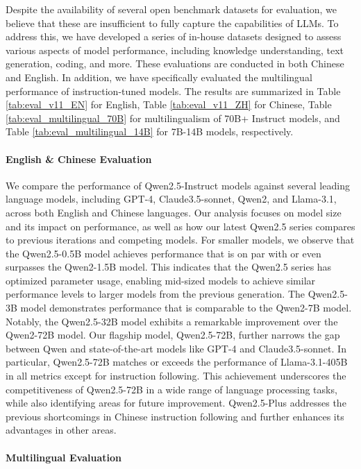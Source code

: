 Despite the availability of several open benchmark datasets for evaluation, we believe that these are insufficient to fully capture the capabilities of LLMs.
To address this, we have developed a series of in-house datasets designed to assess various aspects of model performance, including knowledge understanding, text generation, coding, and more. 
These evaluations are conducted in both Chinese and English.
In addition, we have specifically evaluated the multilingual performance of instruction-tuned models. 
The results are summarized in Table \ref{tab:eval_v11_EN} for English, Table \ref{tab:eval_v11_ZH} for Chinese, Table \ref{tab:eval_multilingual_70B} for multilingualism of 70B+ Instruct models, and Table \ref{tab:eval_multilingual_14B} for 7B-14B models, respectively.



\paragraph{English \& Chinese Evaluation}

We compare the performance of Qwen2.5-Instruct models against several leading language models, including GPT-4, Claude3.5-sonnet, Qwen2, and Llama-3.1, across both English and Chinese languages. Our analysis focuses on model size and its impact on performance, as well as how our latest Qwen2.5 series compares to previous iterations and competing models.
For smaller models, we observe that the Qwen2.5-0.5B model achieves performance that is on par with or even surpasses the Qwen2-1.5B model. 
This indicates that the Qwen2.5 series has optimized parameter usage, enabling mid-sized models to achieve similar performance levels to larger models from the previous generation.
The Qwen2.5-3B model demonstrates performance that is comparable to the Qwen2-7B model. 
Notably, the Qwen2.5-32B model exhibits a remarkable improvement over the Qwen2-72B model.
Our flagship model, Qwen2.5-72B, further narrows the gap between Qwen and state-of-the-art models like GPT-4 and Claude3.5-sonnet. In particular, Qwen2.5-72B matches or exceeds the performance of Llama-3.1-405B in all metrics except for instruction following. This achievement underscores the competitiveness of Qwen2.5-72B in a wide range of language processing tasks, while also identifying areas for future improvement.
Qwen2.5-Plus addresses the previous shortcomings in Chinese instruction following and further enhances its advantages in other areas.


\paragraph{Multilingual Evaluation}



